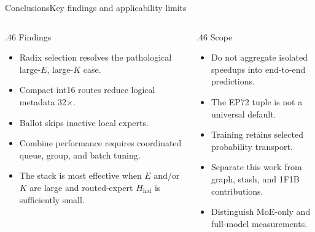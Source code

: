 \documentclass[aspectratio=169,10pt]{beamer}
\begin{document}
\begin{frame}{Conclusions}{Key findings and applicability limits}
  \begin{columns}[T,onlytextwidth]
    \begin{column}{.46\textwidth}
      {\NvidiaSansMedium\color{NvidiaGreen}\fontsize{13}{16}\selectfont Findings}\NvidiaTightRule{.7pt}\vspace{.05in}
      \small
      \begin{itemize}
        \item Radix selection resolves the pathological large-$E$, large-$K$ case.
        \item Compact int16 routes reduce logical metadata 32$\times$.
        \item Ballot skips inactive local experts.
        \item Combine performance requires coordinated queue, group, and batch tuning.
        \item The stack is most effective when $E$ and/or $K$ are large and routed-expert
          $H_{\mathrm{hid}}$ is sufficiently small.
      \end{itemize}
    \end{column}
    \begin{column}{.46\textwidth}
      {\NvidiaSansMedium\color{NvidiaGreen}\fontsize{13}{16}\selectfont Scope}\NvidiaTightRule{.7pt}\vspace{.05in}
      \small
      \begin{itemize}
        \item Do not aggregate isolated speedups into end-to-end predictions.
        \item The EP72 tuple is not a universal default.
        \item Training retains selected probability transport.
        \item Separate this work from graph, stash, and 1F1B contributions.
        \item Distinguish MoE-only and full-model measurements.
      \end{itemize}
    \end{column}
  \end{columns}
\end{frame}
\end{document}
